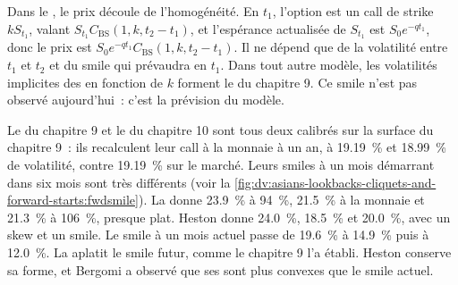 Dans le , le prix découle de l'homogénéité. En $t_1$, l'option est un call de strike $kS_{t_1}$, valant
$S_{t_1}C_{\mathrm{BS}}(1,k,t_2-t_1)$, et l'espérance actualisée de $S_{t_1}$ est $S_0e^{-qt_1}$, donc le prix est
$S_0e^{-qt_1}C_{\mathrm{BS}}(1,k,t_2-t_1)$. Il ne dépend que de la volatilité entre $t_1$ et $t_2$ et du
smile qui prévaudra en $t_1$. Dans tout autre modèle, les volatilités implicites des  en fonction de $k$ forment
le  du chapitre 9. Ce smile n'est pas observé aujourd'hui~: c'est la prévision du modèle.

\begin{example}\label{ex:dv:asians-lookbacks-cliquets-and-forward-starts:fwdsmile}
Le  du chapitre 9 et le  du chapitre 10 sont tous deux calibrés sur la surface du chapitre 9~: ils recalculent
leur call à la monnaie à un an, à 19.19~\% et 18.99~\% de volatilité, contre 19.19~\% sur le marché. Leurs smiles à un mois démarrant dans six
mois sont très différents (voir la \cref{fig:dv:asians-lookbacks-cliquets-and-forward-starts:fwdsmile}). La  donne
23.9~\% à 94~\%, 21.5~\% à la monnaie et 21.3~\% à 106~\%, presque plat. Heston donne 24.0~\%, 18.5~\% et 20.0~\%, avec un skew
et un smile. Le smile à un mois actuel passe de 19.6~\% à 14.9~\% puis à 12.0~\%. La  aplatit le smile futur, comme
le chapitre 9 l'a établi. Heston conserve sa forme, et Bergomi a observé que ses  sont plus convexes que le smile actuel.
\end{example}

